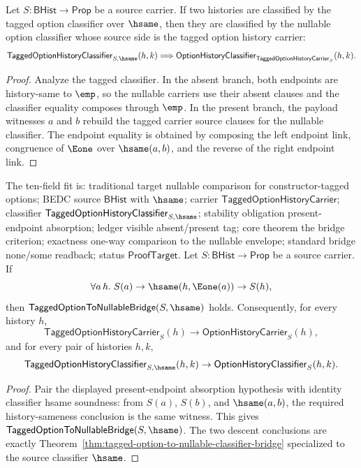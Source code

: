 \begin{theorem}
\label{thm:tagged-option-history-classifier-option-history-classifier}
Let $S:\mathsf{BHist}\to\mathsf{Prop}$ be a source carrier. If two histories
are classified by the tagged option classifier over $\hsame$, then they are
classified by the nullable option classifier whose source side is the tagged
option history carrier:
$$
\mathsf{TaggedOptionHistoryClassifier}_{S,\hsame}(h,k)
\Longrightarrow
\mathsf{OptionHistoryClassifier}_{\mathsf{TaggedOptionHistoryCarrier}_S}(h,k).
$$
\end{theorem}
\begin{proof}
Analyze the tagged classifier. In the absent branch, both endpoints are
history-same to $\emp$, so the nullable carriers use their absent clauses and
the classifier equality composes through $\emp$. In the present branch, the
payload witnesses $a$ and $b$ rebuild the tagged carrier source clauses for
the nullable classifier. The endpoint equality is obtained by composing the
left endpoint link, congruence of $\Eone$ over $\hsame(a,b)$, and the reverse
of the right endpoint link.
\end{proof}

\begin{theorem}
\label{thm:tagged-option-to-nullable-hsame-bridge-criterion}
The ten-field fit is: traditional target nullable comparison for
constructor-tagged options; BEDC source $\mathsf{BHist}$ with $\hsame$; carrier
$\mathsf{TaggedOptionHistoryCarrier}$; classifier
$\mathsf{TaggedOptionHistoryClassifier}_{S,\hsame}$; stability obligation
present-endpoint absorption; ledger visible absent/present tag; core theorem the
bridge criterion; exactness one-way comparison to the nullable envelope; standard
bridge none/some readback; status $\mathsf{ProofTarget}$. Let
$S:\mathsf{BHist}\to\mathsf{Prop}$ be a source carrier. If
$$
  \forall a\,h.\;
    S(a)\to\hsame(h,\Eone(a))\to S(h),
$$
then $\mathsf{TaggedOptionToNullableBridge}(S,\hsame)$ holds. Consequently, for
every history $h$,
$$
  \mathsf{TaggedOptionHistoryCarrier}_S(h)\to
  \mathsf{OptionHistoryCarrier}_S(h),
$$
and for every pair of histories $h,k$,
$$
  \mathsf{TaggedOptionHistoryClassifier}_{S,\hsame}(h,k)\to
  \mathsf{OptionHistoryClassifier}_S(h,k).
$$
\end{theorem}
\begin{proof}
Pair the displayed present-endpoint absorption hypothesis with identity
classifier hsame soundness: from $S(a)$, $S(b)$, and $\hsame(a,b)$, the required
history-sameness conclusion is the same witness. This gives
$\mathsf{TaggedOptionToNullableBridge}(S,\hsame)$. The two descent conclusions
are exactly Theorem~\ref{thm:tagged-option-to-nullable-classifier-bridge}
specialized to the source classifier $\hsame$.
\end{proof}

